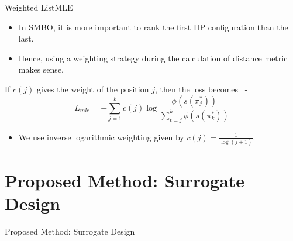 \documentclass{beamer}
\begin{document}
\begin{frame}[t]{Weighted ListMLE}
\begin{itemize}
\item In SMBO,  it is more important to rank the first HP configuration than the last.
\item Hence,  using a weighting strategy during the calculation of distance metric makes sense.
\end{itemize}

If $c(j)$ gives the weight of the position $j$, then the loss becomes~\cite{TRLWO} -
$$
L_{mle} = -  \sum\limits_{j=1}^{k} c(j) \log \frac{\phi(s(\pi^*_j))}{ \sum\limits_{t=j}^k \phi(s(\pi^*_k))}
$$

\begin{itemize}
\item We use inverse logarithmic weighting given by $c(j) = \frac{1}{\log (j+1)}$.
\end{itemize}

\end{frame}


\section{Proposed Method: Surrogate Design}

\begin{frame}

\centering
\LARGE{Proposed Method: Surrogate Design}

\end{frame}
\end{document}
